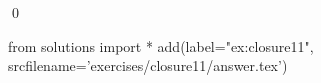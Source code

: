 
\begin{ex} 
  \label{ex:closure11}
  
  \qed
\end{ex} 
\begin{python0}
from solutions import *
add(label="ex:closure11",
    srcfilename='exercises/closure11/answer.tex') 
\end{python0}
